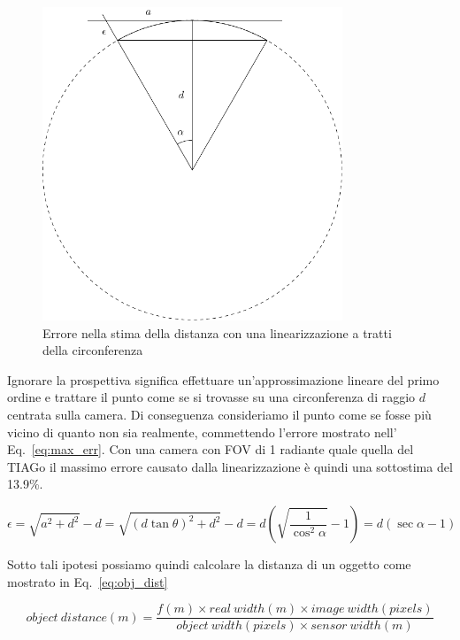 \documentclass[a4paper]{article}
\begin{document}
	\begin{figure}[H]
		\centering
		\includegraphics[width=0.8\textwidth]{./img/linearization_error.pdf}
		\caption{Errore nella stima della distanza con una linearizzazione a tratti della circonferenza}
		\label{fig:error}
	\end{figure}

	Ignorare la prospettiva significa effettuare un'approssimazione lineare del primo ordine e trattare il punto come se si trovasse su una circonferenza di raggio $d$ centrata sulla camera. Di conseguenza consideriamo il punto come se fosse più vicino di quanto non sia realmente, commettendo l'errore mostrato nell' Eq.~\ref{eq:max_err}. Con una camera con FOV di 1 radiante quale quella del TIAGo il massimo errore causato dalla linearizzazione è quindi una sottostima del 13.9\%.
	
	\begin{equation}
	\epsilon = 
	\sqrt{a^2+d^2} - d =
	\sqrt{(d\tan \theta )^2+d^2}-d =
	d\left( \sqrt{\frac{1}{\cos ^2 \alpha}}-1 \right) =
	d \left( \sec \alpha -1 \right) 
	\label{eq:max_err}
	\end{equation}
	
	Sotto tali ipotesi possiamo quindi calcolare la distanza di un oggetto come mostrato in
	Eq.~\ref{eq:obj_dist}
	
	\begin{equation}\label{eq:obj_dist}
	object~distance(m) = 
	\frac{f(m) \times real~width(m) \times image~width(pixels)}
	{object~width(pixels) \times sensor~width(m)}
	\end{equation}
	
\end{document}
